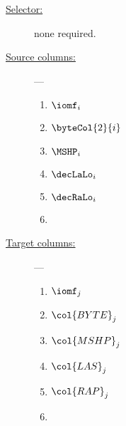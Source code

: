 \begin{description}
	\item[\underline{Selector:}] none required.
	\item[\underline{Source columns:}] ---
	\begin{multicols}{2}
		\begin{enumerate}
			\item $\iomf_{i}$
			\item $\byteCol{2}{i}$
			\item $\MSHP_{i}$
			\item $\decLaLo_{i}$
			\item $\decRaLo_{i}$
			\item [\vspace{\fill}]
		\end{enumerate}
	\end{multicols}
	\item[\underline{Target columns:}] ---
	\begin{multicols}{2}
		\begin{enumerate}
			\item $\iomf_{j}$
			\item $\col{BYTE}_{j}$
			\item $\col{MSHP}_{j}$
			\item $\col{LAS}_{j}$
			\item $\col{RAP}_{j}$
			\item [\vspace{\fill}]
		\end{enumerate}
	\end{multicols}
\end{description}


			
